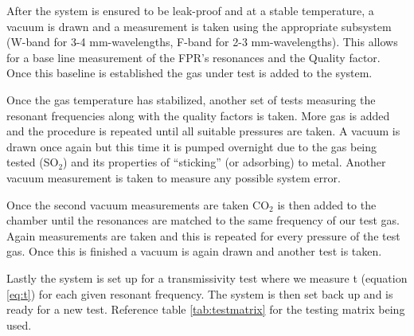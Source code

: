 After the system is ensured to be leak-proof and at a stable temperature, a vacuum is drawn and a measurement is taken using the appropriate subsystem (W-band for 3-4 mm-wavelengths, F-band for 2-3 mm-wavelengths). This allows for a base line measurement of the FPR's resonances and the Quality factor. Once this baseline is established the gas under test is added to the system.

Once the gas temperature has stabilized, another set of tests measuring the resonant frequencies along with the quality factors is taken. More gas is added and the procedure is repeated until all suitable pressures are taken. A vacuum is drawn once again but this time it is pumped overnight due to the gas being tested (SO$_2$) and its properties of ``sticking'' (or adsorbing) to metal. Another vacuum measurement is taken to measure any possible system error.

Once the second vacuum measurements are taken CO$_2$ is then added to the chamber until the resonances are matched to the same frequency of our test gas. Again measurements are taken and this is repeated for every pressure of the test gas. Once this is finished a vacuum is again drawn and another test is taken. 

Lastly the system is set up for a transmissivity test where we measure t (equation \ref{eq:t}) for each given resonant frequency. The system is then set back up and is ready for a new test. Reference table \ref{tab:testmatrix} for the testing matrix being used.


